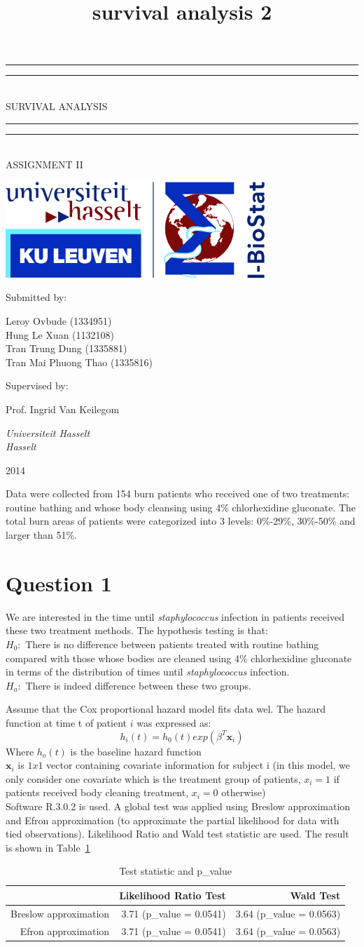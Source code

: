 \documentclass[a4paper, 12pt]{article}
\title{survival analysis 2}
\newcommand*{\titlePG}{\begingroup %
\centering %
\vspace*{\baselineskip} %

\rule{\textwidth}{1.6pt}\vspace*{-\baselineskip}\vspace*{2pt} %
\rule{\textwidth}{0.4pt}\\[\baselineskip] %


{\LARGE SURVIVAL ANALYSIS }\\[0.2\baselineskip]%

\rule{\textwidth}{0.4pt}\vspace*{-\baselineskip}\vspace{3.2pt} %
\rule{\textwidth}{1.6pt}\\[\baselineskip] %

\scshape %
{ASSIGNMENT II} \\[\baselineskip] %
\par 

\vspace*{2\baselineskip} %

\includegraphics[scale=.5]{logoI-BIOSTAT-2.png}

Submitted by: \\[\baselineskip]
{Leroy Ovbude (1334951) \\ Hung Le Xuan (1132108)  \\ Tran Trung Dung (1335881)\\ Tran Mai Phuong Thao (1335816)\\\par} %

\vspace*{2\baselineskip}

Supervised by: \\[\baselineskip]
{Prof. Ingrid Van Keilegom \par} 


\vspace*{2\baselineskip}

{\itshape Universiteit Hasselt \\ Hasselt\par} %

\vfill %

{\scshape 2014} \\[0.3\baselineskip] %

\endgroup}
\begin{document}
 
\clearpage
\titlePG%
\thispagestyle{empty}
\clearpage
\doublespacing

Data were collected from 154 burn patients who received one of two treatments: routine bathing  and whose body cleansing using 4\% chlorhexidine gluconate. The total burn areas of patients were categorized into 3 levels: 0\%-29\%, 30\%-50\% and larger than 51\%.\\

\section*{Question 1}
We are interested in the time until \textit{staphylococcus} infection in patients received these two treatment methods. The hypothesis testing is that:\\
$H_0:$ There is no difference between patients treated with routine bathing compared with those  whose bodies are cleaned using 4\% chlorhexidine gluconate in terms of the distribution of times until \textit{staphylococcus} infection.\\
$H_a:$ There is indeed difference between these two groups.

Assume that the Cox proportional hazard model fits data wel. The hazard function at time t of patient $i$ was expressed as: \\
 \begin{equation}
       h_i(t) = h_0(t)exp(\beta^T\textbf{x}_i) 
 \end{equation}
Where $h_o(t)$ is the baseline hazard function \\
$\textbf{x}_i$ is $1x1$ vector containing covariate information for subject i (in this model, we only consider one covariate which is the treatment group of patients, $x_i =1$ if patients received body cleaning treatment, $x_i = 0$ otherwise)\\

Software R.3.0.2 is used. A global test was applied using Breslow approximation and Efron approximation (to approximate the partial likelihood for data with tied observations). Likelihood Ratio and Wald test statistic are used. The result is shown in Table~\ref{tab:q1}

\begin{table}[htbp]
  \centering
  \caption{Test statistic and p\_value}
    \begin{tabular}{rrr}
    \hline
    \hline
          & Likelihood Ratio Test & Wald Test \\
    \hline
    Breslow approximation & 3.71 (p\_value = 0.0541) & 3.64 (p\_value = 0.0563) \\
    Efron approximation & 3.71 (p\_value = 0.0541) & 3.64 (p\_value = 0.0563) \\
    \hline
    \hline
    \end{tabular}%
  \label{tab:q1}%
\end{table}%
\end{document}
